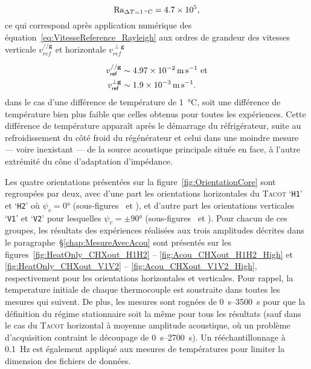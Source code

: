 \begin{equation}
	\Rayleigh_{\Delta T=\qty{1}{\degreeCelsius}}=\num{4.7e5},
	\label{eq:NbrRayleigh_Exple1K}
\end{equation}  
ce qui correspond après application numérique des équation~\eqref{eq:VitesseReference_Rayleigh} aux ordres de grandeur des vitesses verticale $v_{ref}^{// \mathbf g}$ et horizontale $v_{ref}^{\perp \mathbf g}$  

\begin{subequations}
	\begin{align}
		v_{\sf ref}^{// \mathbf g} &\sim \qty{4.97e-2}{\meter\per\second} \text{ et}	\label{eq:VitesseReferenceV_Rayleigh_Exple1K}\\
		v_{\sf ref}^{\perp \mathbf g} &\sim \qty{1.9e-3}{\meter\per\second}.	\label{eq:VitesseReferenceH_Rayleigh_Exple1K}
	\end{align}
	\label{eq:VitesseReference_Rayleigh_Exple5K}%
\end{subequations}
dans le cas d'une différence de température de \qty{1}{\degreeCelsius}, soit une différence de température bien plus faible que celles obtenus pour toutes les expériences. Cette différence de température apparaît après le démarrage du réfrigérateur, suite au refroidissement du côté froid du régénérateur et celui dans une moindre mesure --- voire inexistant --- de la source acoustique principale située en face, à l'autre extrémité du cône d'adaptation d'impédance.

Les quatre orientations présentées sur la figure~\ref{fig:OrientationCore} sont regroupées par deux, avec d'une part les orientations horizontales du \textsc{Tacot} `\texttt{H1}' et `\texttt{H2}' où $\psi_v=\ang{0}$ (sous-figures~ et ), et d'autre part les orientations verticales `\texttt{V1}' et `\texttt{V2}' pour lesquelles $\psi_v=\pm\ang{90}$ (sous-figures~ et ). Pour chacun de ces groupes, les résultats des expériences réalisées aux trois amplitudes décrites dans le paragraphe~§\ref{chap:MesureAvecAcou} sont présentés sur les figures~\ref{fig:HeatOnly_CHXout_H1H2} -- \ref{fig:Acou_CHXout_H1H2_High} et \ref{fig:HeatOnly_CHXout_V1V2} -- \ref{fig:Acou_CHXout_V1V2_High}, respectivement pour les orientations horizontales et verticales. Pour rappel, la temperature initiale de chaque thermocouple est soustraite dans toutes les mesures qui suivent. De plus, les mesures sont rognées de \qtyrange{0}{3500}{\second} pour que la définition du régime stationnaire soit la même pour tous les résultats (sauf dans le cas du \textsc{Tacot} horizontal à moyenne amplitude acoustique, où un problème d'acquisition contraint le découpage de \qtyrange{0}{2700}{\second}). Un rééchantillonnage à \qty{.1}{\hertz} est également appliqué aux mesures de températures pour limiter la dimension des fichiers de données.


